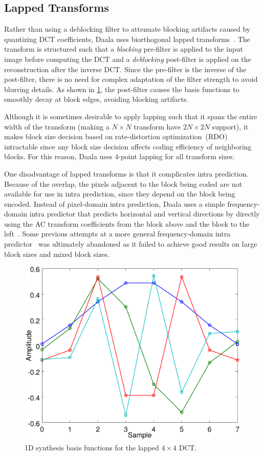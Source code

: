\documentclass[english,conference,10pt]{IEEEtran}
\begin{document}
\subsection{Lapped Transforms}

Rather than using a deblocking filter to attenuate blocking artifacts caused
by quantizing DCT coefficients, Daala uses biorthogonal lapped
transforms~\cite{MalvarS89,Tran2003}. The transform is structured such that
a \textit{blocking} pre-filter is applied to the input image before computing
the DCT and a \textit{deblocking} post-filter is applied on the reconstruction
after the inverse DCT. Since the pre-filter is the inverse of the post-filter,
there is no need for complex adaptation of the filter strength to avoid blurring
details. As shown in \cref{fig:basis4}, the post-filter causes the basis functions
to smoothly decay at block edges, avoiding blocking artifacts.

Although it is sometimes desirable to apply lapping such that it spans the entire
width of the transform (making a $N \times N$ transform have $2N \times 2N$ support),
it makes block size decision based on rate-distortion optimization~(RDO) intractable
since any block size decision affects coding efficiency of neighboring blocks. For
this reason, Daala uses 4-point lapping for all transform sizes.

One disadvantage of lapped transforms is that it complicates intra prediction.
Because of the overlap, the pixels adjacent to the block being coded are not
available for use in intra prediction, since they depend on the block being
encoded. Instead of pixel-domain intra prediction, Daala uses a simple
frequency-domain intra predictor that predicts horizontal and vertical directions
by directly using the AC transform coefficients from the block above and the
block to the left~\cite{EggePCS}. Some previous attempts at a more general
frequency-domain intra predictor~\cite{fdintra-demo} was ultimately abandoned
as it failed to achieve good results on large block sizes and mixed block sizes.


\begin{figure}
	\centering
	\includegraphics[width=0.8\columnwidth]{basis4}
	\caption{1D synthesis basis functions for the lapped $4 \times 4$ DCT.}
	\label{fig:basis4}
\end{figure}
\end{document}
